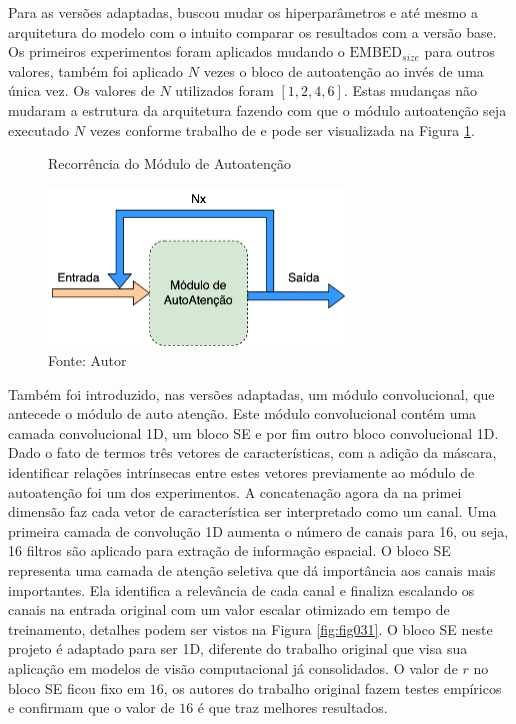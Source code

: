 Para as versões adaptadas, buscou mudar os hiperparâmetros e até mesmo a arquitetura do modelo com o intuito comparar os resultados com a versão base. Os primeiros experimentos foram aplicados mudando o $\text{EMBED}_{size}$ para outros valores, também foi aplicado $N$ vezes o bloco de autoatenção ao invés de uma única vez. Os valores de $N$ utilizados foram $[1, 2, 4, 6]$. Estas mudanças não mudaram a estrutura da arquitetura fazendo com que o módulo autoatenção seja executado $N$ vezes conforme trabalho de \cite{vaswaniAttentionAllYou2023} e pode ser visualizada na Figura \ref{fig:fig030}.

\begin{figure}[h!]
    \centering
    \caption{Recorrência do Módulo de Autoatenção}
    \includegraphics[width=0.7\textwidth]{figures/fig030.png}
    \caption*{Fonte: Autor}
    \label{fig:fig030}
\end{figure}

Também foi introduzido, nas versões adaptadas, um módulo convolucional, que antecede o módulo de auto atenção. Este módulo convolucional contém uma camada convolucional 1D, um bloco \gls{SE} e por fim outro bloco convolucional 1D. Dado o fato de termos três vetores de características, com a adição da máscara, identificar relações intrínsecas entre estes vetores previamente ao módulo de autoatenção foi um dos experimentos. A concatenação agora da na primei dimensão faz cada vetor de característica ser interpretado como um canal. Uma primeira camada de convolução 1D aumenta o número de canais para 16, ou seja, 16 filtros são aplicado para extração de informação espacial. O bloco \gls{SE} representa uma camada de atenção seletiva que dá importância aos canais mais importantes. Ela identifica a relevância de cada canal e finaliza escalando os canais na entrada original com um valor escalar otimizado em tempo de treinamento, detalhes podem ser vistos na Figura \ref{fig:fig031}. O bloco \gls{SE} neste projeto é adaptado para ser 1D, diferente do trabalho original que visa sua aplicação em modelos de visão computacional já consolidados. O valor de $r$ no bloco \gls{SE} ficou fixo em $16$, os autores do trabalho original fazem testes empíricos e confirmam que o valor de $16$ é que traz melhores resultados.

